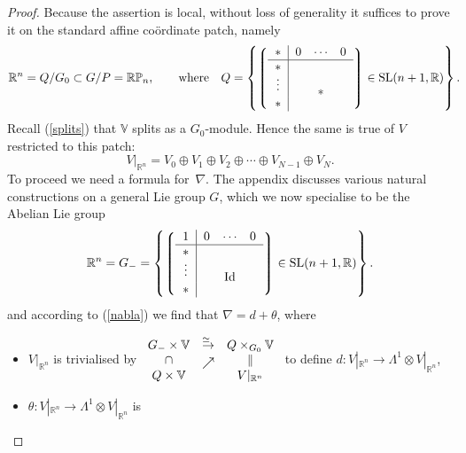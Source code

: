 \documentclass[11pt]{article}
\begin{document}
\begin{proof}
Because the assertion is local, without loss of generality it suf\/f\/ices to prove
it on the standard af\/f\/ine co\"ordinate patch, namely
\begin{gather}\label{Q}
{\mathbb{R}}^n=Q/G_0\subset G/P={\mathbb{RP}}_n,\qquad\mbox{where}\quad
Q=\left\{
\left\lgroup\begin{tabular}{c|ccc}$\ast$&$0$&$\!\cdots\!$&$0$\\ \hline
$\ast$\\
\raisebox{2pt}[15pt]{$\vdots$}&&
\raisebox{-2pt}[0pt][0pt]{\makebox[0pt]{\Huge$\ast$}}\\
$\ast$\end{tabular}\right\rgroup\in{\mathrm{SL}}(n+1,{\mathbb{R}})\right\}.\!\!\!\!
\end{gather}
Recall (\ref{splits}) that ${\mathbb{V}}$ splits as a $G_0$-module. Hence the
same is true of $V$ restricted to this patch:%
\begin{equation}\label{Vsplitting}V|_{{\mathbb{R}}^n}
=V_0\oplus V_1\oplus V_2\oplus\cdots\oplus V_{N-1}\oplus V_N.\end{equation}
To proceed we need a formula for~$\nabla$. The appendix discusses various
natural constructions on a general Lie group $G$, which we now specialise to
be the Abelian Lie group
\[{\mathbb{R}}^n=
G_-=\left\{
\left\lgroup\begin{tabular}{c|ccc}$1$&$0$&$\!\cdots\!$&$0$\\ \hline
$\ast$\\
\raisebox{2pt}[15pt]{$\vdots$}&&
\raisebox{-2pt}[0pt][0pt]{\makebox[0pt]{\LARGE${\mathrm{Id}}$}}\\
$\ast$\end{tabular}\right\rgroup\in{\mathrm{SL}}(n+1,{\mathbb{R}})\right\}.\]
and according to (\ref{nabla}) we f\/ind that $\nabla=d+\theta$, where
\begin{itemize}\itemsep=0pt
\item $V|_{{\mathbb{R}}^n}$ is trivialised by
$\begin{array}{ccc}G_-\times{\mathbb{V}}&
\stackrel{\simeq\:\:}{\rightarrow}&Q\times_{G_0}{\mathbb{V}}\\
\cap&\raisebox{-2pt}{$\nearrow$}&\|\\
Q\times{\mathbb{V}}&&V|_{{\mathbb{R}}^n}
\end{array}$ to def\/ine
$d:V|_{{\mathbb{R}}^n}\to\Lambda^1\otimes V|_{{\mathbb{R}}^n}$,
\item $\theta:V|_{{\mathbb{R}}^n}\to\Lambda^1\otimes V|_{{\mathbb{R}}^n}$ is

\end{itemize}
\end{proof}
\end{document}
